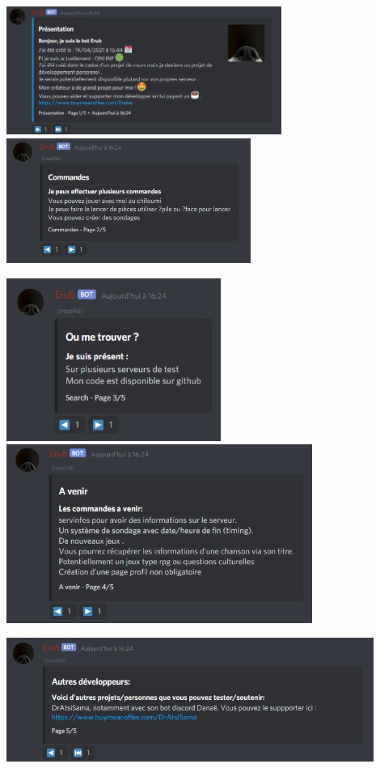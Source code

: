 \includegraphics[width=9cm]{img/botinfo_page_1.jpg}\includegraphics[width=8cm]{img/botinfo_page_2.jpg}
    
    \includegraphics[width=7cm]{img/botinfo_page_3.jpg}\includegraphics[width=10cm]{img/botinfo_page_4.jpg}
    
    \includegraphics[width=12cm]{img/botinfo_page_5.jpg}